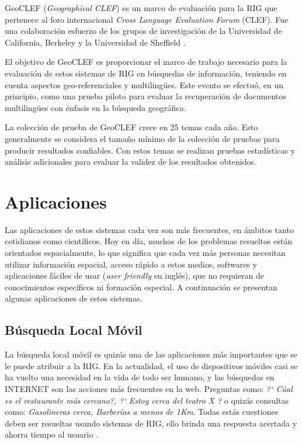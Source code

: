 \documentclass{llncs}
\begin{document}
GeoCLEF (\emph{Geographical CLEF}) es un marco de evaluación para la RIG que
pertenece al foro internacional \emph{Cross Language Evaluation Forum} (CLEF).
Fue una colaboración esfuerzo de los grupos de investigación de la Universidad
de California, Berkeley y la Universidad de Sheffield \cite{gey2005,kornai2005}.

El objetivo de GeoCLEF es proporcionar el marco de trabajo necesario para la
evaluación de estos sistemas de RIG en búsquedas de información, teniendo en
cuenta aspectos geo-referenciales y multilingües. Este evento se efectuó, en un
principio, como una prueba piloto para evaluar la recuperación de documentos
multilingües con énfasis en la búsqueda geográfica.

La colección de prueba de GeoCLEF crece en 25 temas cada año. Esto generalmente
se considera el tamaño mínimo de la colección de pruebas para producir
resultados confiables. Con estos temas se realizan pruebas estadísticas y
análisis adicionales para evaluar la validez de los resultados obtenidos.

\newpage

\section{Aplicaciones}\label{sec:appl}

Las aplicaciones de estos sistemas cada vez son más frecuentes, en ámbitos
tanto cotidianos como científicos. Hoy en día, muchos de los problemas
resueltos están orientados espacialmente, lo que significa que cada vez más
personas necesitan utilizar información espacial, acceso rápido a estos medios,
softwares y aplicaciones fáciles de usar (\emph{user friendly} en inglés), que no
requieran de conocimientos específicos ni formación especial. A continuación
se presentan algunas aplicaciones de estos sistemas.

\subsection{Búsqueda Local Móvil}\label{sec:mobile}

La búsqueda local móvil es quizás una de las aplicaciones más importantes que
se le puede atribuir a la RIG. En la actualidad, el uso de dispositivos móviles
casi se ha vuelto una necesidad en la vida de todo ser humano, y las búsquedas
en INTERNET son las acciones más frecuentes en la web. Preguntas como: \emph{?`
Cúal es el restaurante más cercano?, ?` Estoy cerca del teatro X ?} o quizás
consultas como: \emph{Gasolineras cerca, Barberías a menos de 1Km}. Todas estás
cuestiones deben ser resueltas usando sistemas de RIG, ello brinda una
respuesta acertada y ahorra tiempo al usuario
\cite{teevan2011,lymberopoulos2011}. 
\end{document}

